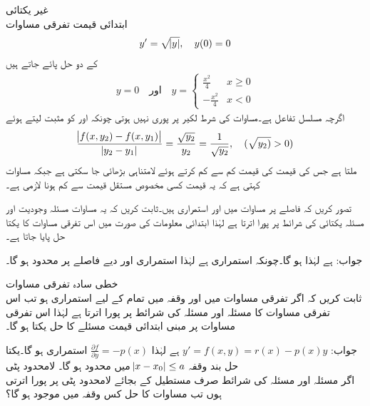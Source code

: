 \quad غیر یکتائی\\
ابتدائی قیمت تفرقی مساوات
\begin{align*}
y'=\sqrt{\abs{y}},\quad y(0)=0
\end{align*}
کے دو حل پائے جاتے ہیں
\begin{align*}
y=0 \quad \text{اور} \quad y=\begin{cases} \frac{x^2}{4} & x \ge 0\\ -\frac{x^2}{4} & x <0   \end{cases}
\end{align*}
اگرچہ  مسلسل تفاعل ہے۔مساوات  کی شرط لکیر  پر پوری نہیں ہوتی چونکہ  اور  کو مثبت لیتے ہوئے 
\begin{align*}
\frac{\abs{f(x,y_2)-f(x,y_1)}}{\abs{y_2-y_1}}=\frac{\sqrt{y_2}}{y_2}=\frac{1}{\sqrt{y_2}}, \quad (\sqrt{y_2)} >0)
\end{align*}
ملتا ہے جس کی قیمت  کی قیمت کم سے کم کرتے ہوئے لامتناہی بڑھائی جا سکتی ہے جبکہ مساوات  کہتی ہے کہ یہ قیمت کسی مخصوص مستقل قیمت  سے کم ہونا لازمی ہے۔


تصور کریں کہ  فاصلے پر مساوات  میں  اور  استمراری ہیں۔ثابت کریں کہ یہ مساوات  مسئلہ وجودیت اور مسئلہ یکتائی کی شرائط پر پورا اترتا ہے لہٰذا ابتدائی معلومات کی صورت میں اس تفرقی مساوات کا یکتا حل پایا جاتا ہے۔

جواب: ہے لہٰذا  ہو گا۔چونکہ  استمراری ہے لہٰذا   استمراری اور دیے فاصلے پر محدود ہو گا۔


\quad خطی سادہ تفرقی مساوات\\
ثابت کریں کہ اگر تفرقی مساوات  میں  اور   وقفہ  میں تمام  کے لیے استمراری ہو تب اس تفرقی مساوات کا  مسئلہ  اور مسئلہ  کی شرائط پر پورا اترتا ہے لہٰذا اس تفرقی مساوات پر مبنی ابتدائی قیمت مسئلے کا حل یکتا ہو گا۔ 

جواب:
$y'=f(x,y)=r(x)-p(x)y$
ہے لہٰذا 
$\frac{\partial f}{\partial y}=-p(x)$
استمراری ہو گا۔یکتا حل بند  وقفہ 
$\abs{x-x_0}\le a$
میں محدود ہو گا۔
\quad لامحدود پٹی\\
اگر مسئلہ  اور مسئلہ  کی شرائط صرف مستطیل کے بجائے لامحدود پٹی  پر پورا اترتی ہوں  تب مساوات  کا حل کس وقفہ میں موجود ہو گا؟

